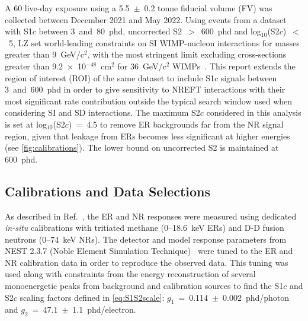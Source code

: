 \documentclass[reprint, showpacs,
preprintnumbers,
amsmath,amssymb,
aps, floatfix,
superscriptaddress,
prd, nofootinbib]{revtex4-1}
\begin{document}
A 60 live-day exposure using a 5.5~$\pm$~0.2 tonne fiducial volume (FV) was collected between December 2021 and May 2022. 
Using events from a dataset with S1$c$ between 3~and~80~phd, uncorrected S2~$>$~600~phd and log$_{10}$(S2$c$)~$<$~5, LZ set world-leading constraints on SI WIMP-nucleon interactions for masses greater than 9~GeV/c$^2$, 
with the most stringent limit excluding cross-sections greater than 9.2~$\times$~10$^{-48}$~cm$^2$ for 36~GeV/c$^2$ WIMPs~\cite{LZ:SR1WS_2022}. 
This report extends the region of interest (ROI) of the same dataset to include S1$c$ signals between 3~and~600~phd in order to give sensitivity to NREFT interactions with their most significant rate contribution outside the typical search window used when considering SI and SD interactions. The maximum S2$c$ considered in this analysis is set at log$_{10}$(S2$c$)~=~4.5 to remove ER backgrounds far from the NR signal region, given that leakage from ERs becomes less significant at higher energies (see \autoref{fig:calibrations}).
The lower bound on uncorrected S2 is maintained at 600~phd.

\subsection{\label{subsec:cal_and_data}Calibrations and Data Selections}
\par
As described in Ref.~\cite{LZ:SR1WS_2022}, the ER and NR responses were measured using dedicated \textit{in-situ} calibrations with tritiated methane (0--18.6~keV ERs) and D-D fusion neutrons (0--74~keV NRs). 
The detector and model response parameters from NEST 2.3.7 (Noble Element Simulation Technique)~\cite{NEST:paper_2022, NEST:paper_2023} were tuned to the ER and NR calibration data in order to reproduce the observed data. This tuning was used along with constraints from the energy reconstruction of several monoenergetic peaks from background and calibration sources to find the S1$c$ and S2$c$ scaling factors defined in \autoref{eq:S1S2scale}: $g_1$~=~0.114~$\pm$~0.002~phd/photon and $g_2$~=~47.1~$\pm$~1.1~phd/electron. 
\end{document}
